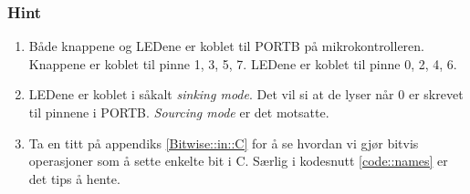 \documentclass[11pt,a4paper]{article}
\begin{document}
\subsubsection{Hint}
\begin{enumerate}
\item Både knappene og LEDene er koblet til PORTB på mikrokontrolleren. Knappene er koblet til pinne 1, 3, 5, 7. LEDene er koblet til pinne 0, 2, 4, 6.
\item LEDene er koblet i såkalt \textit{sinking mode}. Det vil si at de lyser når 0 er skrevet til pinnene i PORTB. \textit{Sourcing mode} er det motsatte.
\item Ta en titt på appendiks \ref{Bitwise::in::C} for å se hvordan vi gjør bitvis operasjoner som å sette enkelte bit i C. Særlig i kodesnutt \ref{code::names} er det tips å hente.
\end{enumerate}
\end{document}
